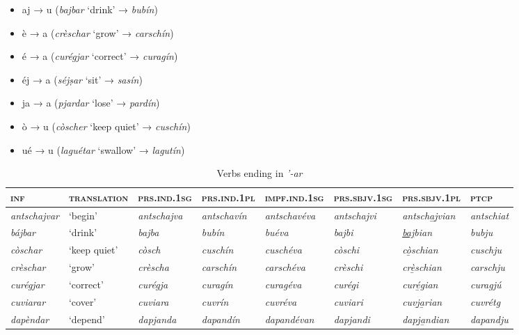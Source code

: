  \begin{itemize}
 	\item aj → u (\textit{bajbar} `drink' → \textit{bubín})
 	\item è → a (\textit{crèschar} `grow' → \textit{carschín})
 	\item é → a (\textit{curégjar} `correct' → \textit{curagín})
 	\item éj → a (\textit{séjṣar} `sit' → \textit{sasín})
 	\item ja → a (\textit{pjardar} `lose' → \textit{pardín})
 	\item ò → u (\textit{còscher} `keep quiet' → \textit{cuschín})
 	\item ué → u (\textit{laguétar} `swallow' → \textit{lagutín})
 	 \end{itemize}

\begin{sidewaystable} 
	\caption{Verbs ending in \textit{'-ar}}
	\label{stemaltvar}
	\begin{tabularx}{\textwidth}{llllllll} 
		\lsptoprule
		\textsc{\textbf{inf}} & \textsc{\textbf{translation}} & \textsc{\textbf{prs.ind.1sg}} & \textsc{\textbf{prs.ind.1pl}} & \textsc{\textbf{impf.ind.1sg}} & \textsc{\textbf{prs.sbjv.1sg}} & \textsc{\textbf{prs.sbjv.1pl}} & \textsc{\textbf{ptcp}}\\
		\midrule
		\textit{antschajvar} & `begin' & \textit{antschajva} & \textit{antschavín} & \textit{antschavéva} &  \textit{antschajvi} & \textit{antscha̱j̱vian} & \textit{antschiat}\\
		\textit{bájbar} & `drink' & \textit{bajba} & \textit{bubín} & \textit{buéva} & \textit{bajbi} & \textit{\underline{baj}bian} & \textit{bubju}\\
		\textit{còschar} & `keep quiet' & \textit{còsch} & \textit{cuschín} & \textit{cuschéva} & \textit{còschi} & \textit{cò̱schian} & \textit{cuschju}\\
		\textit{crèschar} & `grow' & \textit{crèscha} & \textit{carschín} & \textit{carschéva} & \textit{crèschi} & \textit{crè̱schian}  & \textit{carschju}\\
		\textit{curégjar} & `correct' & \textit{curégja} & \textit{curagín} & \textit{curagéva} & \textit{curégi} & \textit{curé̱gian} & \textit{curagjú}\\
		\textit{cuviarar} & `cover' & \textit{cuviara} & \textit{cuvrín} & \textit{cuvréva} & \textit{cuviari} & \textit{cuvj̱a̱rian} & \textit{cuvrétg}\\
		\textit{dapèndar} & `depend' & \textit{dapjanda} & \textit{dapandín} & \textit{dapandévan} & \textit{dapjandi} & \textit{dapj̱a̱ndian} & \textit{dapandju}\\

\end{tabularx}
\end{sidewaystable}
